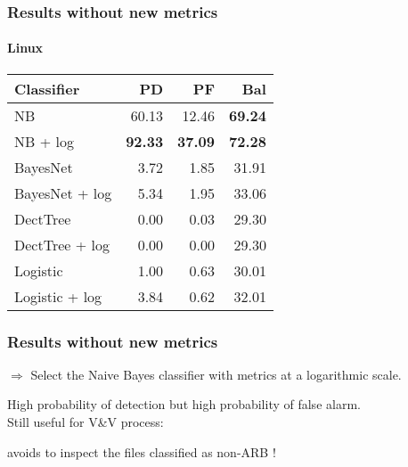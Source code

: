 \begin{frame}
 \frametitle{Results without new metrics}%
 \framesubtitle{Linux}
 \begin{center}
 \begin{tabular}{lrrr}
  \hspace{0.2cm} Classifier & PD & PF & Bal\\
  \hline
  NB & 60.13 & 12.46 & \textbf{69.24}\\
  NB + log &  \textbf{92.33} & \textbf{37.09} & \textbf{72.28}\\
  BayesNet & 3.72 & 1.85 & 31.91\\
  BayesNet + log & 5.34 & 1.95 & 33.06\\
  DectTree & 0.00 & 0.03 & 29.30\\
  DectTree + log & 0.00 & 0.00 & 29.30\\
  Logistic & 1.00 & 0.63 & 30.01\\
  Logistic + log & 3.84 & 0.62 & 32.01\\
  \hline
 \end{tabular}
 \end{center}
\end{frame}

\begin{frame}
 \frametitle{Results without new metrics}
 \begin{center}
  $\Longrightarrow$ \alert{Select the Naive Bayes classifier with metrics at a logarithmic scale.}
 \end{center}
 \vspace{1cm}
 High probability of detection but high probability of false alarm.\\%
 Still useful for V\&V process:
 \begin{center}
  \alert{avoids to inspect the files classified as non-ARB !}
 \end{center}
\end{frame}